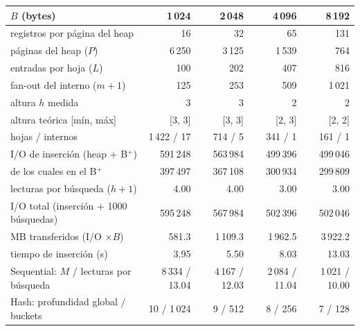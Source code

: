 \begin{tabular}{@{}lrrrr@{}}
\toprule
$B$ (bytes) & 1\,024 & 2\,048 & 4\,096 & 8\,192 \\
\midrule
registros por página del heap & 16 & 32 & 65 & 131 \\
páginas del heap ($P$) & 6\,250 & 3\,125 & 1\,539 & 764 \\
entradas por hoja ($L$) & 100 & 202 & 407 & 816 \\
fan-out del interno ($m+1$) & 125 & 253 & 509 & 1\,021 \\
altura $h$ medida & 3 & 3 & 2 & 2 \\
altura teórica [mín, máx] & [3, 3] & [3, 3] & [2, 3] & [2, 2] \\
hojas / internos & 1\,422 / 17 & 714 / 5 & 341 / 1 & 161 / 1 \\
I/O de inserción (heap + B$^+$) & 591\,248 & 563\,984 & 499\,396 & 499\,046 \\
\quad de los cuales en el B$^+$ & 397\,497 & 367\,108 & 300\,934 & 299\,809 \\
lecturas por búsqueda ($h+1$) & 4.00 & 4.00 & 3.00 & 3.00 \\
I/O total (inserción + 1000 búsquedas) & 595\,248 & 567\,984 & 502\,396 & 502\,046 \\
MB transferidos (I/O $\times B$) & 581.3 & 1\,109.3 & 1\,962.5 & 3\,922.2 \\
tiempo de inserción (s) & 3.95 & 5.50 & 8.03 & 13.03 \\
Sequential: $M$ / lecturas por búsqueda & 8\,334 / 13.04 & 4\,167 / 12.03 & 2\,084 / 11.04 & 1\,021 / 10.00 \\
Hash: profundidad global / buckets & 10 / 1\,024 & 9 / 512 & 8 / 256 & 7 / 128 \\
\bottomrule
\end{tabular}
